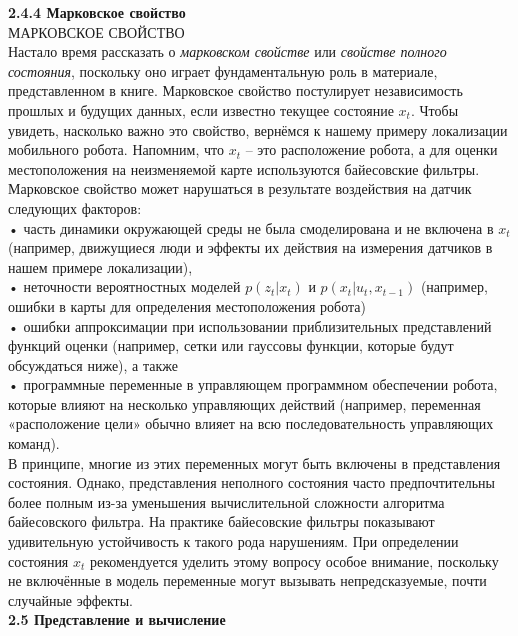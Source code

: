 \documentclass[10pt,a4paper]{article}
\begin{document}
\textbf{ 2.4.4 Марковское свойство}\\

 МАРКОВСКОЕ СВОЙСТВО\\
 
 Настало время рассказать о \textit{марковском свойстве} или \textit{свойстве полного состояния}, поскольку оно играет фундаментальную роль в материале, представленном в книге. 
 Марковское свойство постулирует независимость прошлых и будущих данных, если известно текущее состояние $x_t$. Чтобы увидеть, насколько важно это свойство, вернёмся к нашему примеру локализации мобильного робота. Напомним, что $x_t$ – это расположение робота, а   для оценки местоположения на неизменяемой карте используются байесовские фильтры. Марковское свойство может нарушаться в результате воздействия на датчик следующих факторов:\\
 
 • часть динамики окружающей среды не была смоделирована и не включена в $x_t$ (например, движущиеся люди и эффекты их действия на измерения датчиков в нашем примере локализации),\\
 
 • неточности вероятностных моделей $p(z_t | x_t)$ и $p(x_t | u_t, x_{t-1})$ (например, ошибки в карты для определения местоположения робота)\\
 
 • ошибки аппроксимации при использовании приблизительных представлений функций оценки (например, сетки или гауссовы функции, которые будут обсуждаться ниже), а также\\
 
 • программные переменные в управляющем программном обеспечении робота, которые влияют на несколько управляющих действий (например, переменная «расположение цели» обычно влияет на всю последовательность управляющих команд).\\
 
 В принципе, многие из этих переменных могут быть включены в представления состояния. Однако, представления неполного состояния часто предпочтительны более полным из-за уменьшения вычислительной сложности алгоритма байесовского фильтра. На практике байесовские фильтры показывают удивительную устойчивость к такого рода нарушениям. 
 При определении состояния $x_t$ рекомендуется уделить этому вопросу особое внимание, поскольку не включённые в модель переменные могут вызывать непредсказуемые, почти случайные эффекты.\\ 
 
 \textbf{2.5 Представление и вычисление}\\
 
\end{document}
